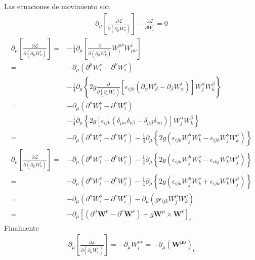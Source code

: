 Las ecuaciones de movimiento son
\begin{align}
  \label{eq:172}
  \partial_\mu\left[\frac{\partial\mathcal{L}}{\partial(\partial_\mu W_\nu^i)}\right]-\frac{\partial\mathcal{L}}{\partial W_\nu^i}=0
\end{align}
\begin{align}
  \partial_\mu\left[\frac{\partial\mathcal{L}}{\partial(\partial_\mu W_\nu^i)}\right]=&
-\frac{1}{4}\partial_\mu\left[\frac{\partial}{\partial(\partial_\mu W_\nu^i)}W^{\mu\nu}_i W_{\mu\nu}^i\right]\nonumber\\
=&-\partial_\mu(\partial^\mu W^\nu_i -\partial^\nu W^\nu_i)\nonumber\\
&-\frac{1}{4}\partial_\mu\left\{2g\frac{\partial}{\partial(\partial_\mu W_\nu^i)}\left[\epsilon_{ijk}(\partial_\alpha W_\beta^i -\partial_\beta W_\alpha^i)\right]W^\alpha_j W^\beta_k \right\} \nonumber\\
  =&-\partial_\mu(\partial^\mu W^\nu_i -\partial^\nu W^\nu_i)\nonumber\\
&-\frac{1}{4}\partial_\mu\left\{2g\left[\epsilon_{ijk}(\delta_{\mu\alpha}\delta_{\nu\beta} -\delta_{\mu\beta}\delta_{\nu\alpha})\right]W^\alpha_j W^\beta_k \right\} \nonumber\\
  =&-\partial_\mu(\partial^\mu W^\nu_i -\partial^\nu W^\nu_i)
-\frac{1}{4}\partial_\mu\left\{2g\left(\epsilon_{ijk}W^\mu_j W^\nu_k -\epsilon_{ijk}W^\nu_j W^\mu_k\right) \right\} \nonumber
\end{align}
\begin{align}
  \partial_\mu\left[\frac{\partial\mathcal{L}}{\partial(\partial_\mu W_\nu^i)}\right]    =&-\partial_\mu(\partial^\mu W^\nu_i -\partial^\nu W^\nu_i)
-\frac{1}{4}\partial_\mu\left\{2g\left(\epsilon_{ijk}W^\mu_j W^\nu_k -\epsilon_{ikj}W^\nu_k W^\mu_j\right) \right\} \nonumber\\
  =&-\partial_\mu(\partial^\mu W^\nu_i -\partial^\nu W^\nu_i)
  -\frac{1}{4}\partial_\mu\left\{2g\left(\epsilon_{ijk}W^\mu_j W^\nu_k +\epsilon_{ijk}W^\nu_k W^\mu_j\right) \right\} \nonumber\\
  =&-\partial_\mu(\partial^\mu W^\nu_i -\partial^\nu W^\nu_i)-\partial_\mu\left(g\epsilon_{ijk}W^\mu_j W^\nu_k\right)\nonumber\\
  =&-\partial_\mu\left[(\partial^\mu\mathbf{W}^\nu -\partial^\nu\mathbf{W}^\nu)+g\mathbf{W}^\mu\times\mathbf{W}^\nu\right]_i\nonumber
\end{align}
Finalmente
\begin{align}
\label{eq:175}
  \partial_\mu\left[\frac{\partial\mathcal{L}}{\partial(\partial_\mu W_\nu^i)}\right]=-\partial_\mu W^{\mu\nu}_i=-\partial_\mu(\mathbf{W^{\mu\nu}})_i
\end{align}
